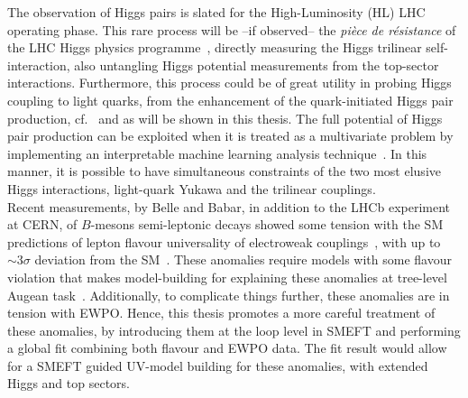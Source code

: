The observation of Higgs pairs is slated for the High-Luminosity (HL) LHC operating phase. This rare process will be --if observed-- the {\it pi\`ece de r\'esistance} of the LHC Higgs physics programme~\cite{Bernius:2666331}, directly measuring the Higgs trilinear self-interaction, also untangling Higgs potential measurements from the top-sector interactions. Furthermore,  this process could be of great utility in probing Higgs coupling to light quarks, from the enhancement of the quark-initiated Higgs pair production, cf.~\cite{Alasfar:2019pmn,Egana-Ugrinovic:2021uew} and as will be shown in this thesis.  The full potential of Higgs pair production can be exploited when it is treated as a multivariate problem by implementing an interpretable machine learning analysis technique~\cite{Grojean:2020ech}. In this manner, it is possible to have  simultaneous constraints of the two most elusive Higgs interactions, light-quark Yukawa and the trilinear couplings.\\
Recent measurements, by Belle and Babar, in addition to the LHCb experiment at CERN, of $B$-mesons semi-leptonic decays showed some tension with the SM predictions of lepton flavour universality of electroweak couplings~\cite{Aaij:2014ora,Aaij:2017vbb,Aaij:2019wad,Abdesselam:2019wac,LHCb:2021trn}, with up to $\sim 3\sigma$ deviation from the SM~\cite{Chatrchyan:2013bka,Aaij:2017vad,Aaboud:2018mst,Aaij:2020nol}. These anomalies require models with some flavour violation that makes model-building for explaining these anomalies at tree-level  Augean task~\cite{DiLuzio:2017vat,Calibbi:2017qbu,Bordone:2017bld,Barbieri:2017tuq,Assad:2017iib,Heeck:2018ntp,Fornal:2018dqn,Crivellin:2018yvo,Crivellin:2019dwb,Bordone:2019uzc}. Additionally, to complicate things further, these anomalies are in tension with EWPO. Hence, this thesis promotes a more careful treatment of these anomalies, by introducing them at the loop level in SMEFT and performing a global fit combining both flavour and EWPO data. The fit result would allow for a SMEFT guided UV-model building for these anomalies, with extended Higgs and top sectors. \\

